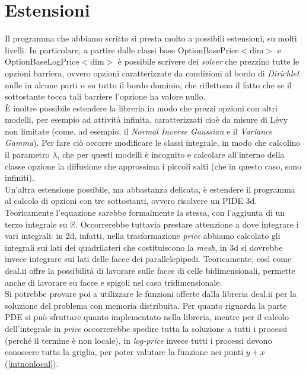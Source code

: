 \documentclass[a4paper,10pt]{report}
\theoremstyle{plain}
\theoremstyle{definition}
\theoremstyle{remark}
\begin{document}
\chapter{Estensioni}
Il programma che abbiamo scritto si presta molto a possibili estensioni, su molti livelli. In particolare, a partire dalle classi base \textsf{OptionBasePrice$<$dim$>$} e \textsf{OptionBaseLogPrice$<$dim$>$} \`e possibile scrivere dei \emph{solver} che prezzino tutte le opzioni barriera, ovvero opzioni caratterizzate da condizioni al bordo di \emph{Dirichlet} nulle in alcune parti o su tutto il bordo dominio, che riflettono il fatto che se il sottostante tocca tali barriere l'opzione ha valore nullo.\\\`E inoltre possibile estendere la libreria in modo che prezzi opzioni con altri modelli, per esempio ad attivit\`a infinita, caratterizzati cio\`e da misure di L\'evy non limitate (come, ad esempio, il \emph{Normal Inverse Gaussian} e il \emph{Variance Gamma}). Per fare ci\`o occorre modificare le classi integrale, in modo che calcolino il parametro $\lambda$, che per questi modelli \`e incognito e calcolare all'interno della classe opzione la diffusione che approssima i piccoli salti (che in questo caso, sono infiniti).\\Un'altra estensione possibile, ma abbastanza delicata, \`e estendere il programma al calcolo di opzioni con tre sottostanti, ovvero risolvere un PIDE 3d. Teoricamente l'equazione sarebbe formalmente la stessa, con l'aggiunta di un terzo integrale su $\mathbb{R}$. Occorrerebbe tuttavia prestare attenzione a dove integrare i vari integrali: in 2d, infatti, nella trasformazione \emph{price} abbiamo calcolato gli integrali sui lati dei quadrilateri che costituiscono la \emph{mesh}, in 3d si dovrebbe invece integrare sui lati delle facce dei parallelepipedi. Teoricamente, cos\`i come \textsf{deal.ii} offre la possibilità di lavorare sulle facce di celle bidimensionali, permette anche di lavorare su facce e spigoli nel caso tridimensionale. \\Si potrebbe provare poi a utilizzare le funzioni offerte dalla libreria \textsf{deal.ii} per la soluzione del problema con memoria distribuita. Per quanto riguarda la parte PDE si pu\`o sfruttare quanto implementato nella libreria, mentre per il calcolo dell'integrale in \emph{price} occorrerebbe spedire tutta la soluzione a tutti i processi (perch\'e il termine \`e non locale), in \emph{log-price} invece tutti i processi devono conoscere tutta la griglia, per poter valutare la funzione nei punti $y+x$ (\ref{intnonlocal}).\\\\
\end{document}
